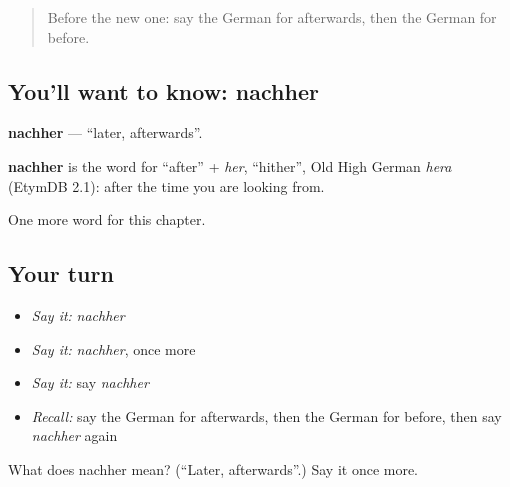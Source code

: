 \begin{quote}
Before the new one: say the German for afterwards, then the German for before.
\end{quote}

\subsection*{You'll want to know: nachher}
\textbf{nachher} — \textquotedblleft{}later, afterwards\textquotedblright{}.

\begin{cousinweb}
\textbf{nachher} is the word for \textquotedblleft{}after\textquotedblright{} + \emph{her}, \textquotedblleft{}hither\textquotedblright{}, Old High German \emph{hera} (EtymDB 2.1): after the time you are looking from.
\end{cousinweb}

\begin{grammarlens}[title={What you've built}]
One more word for this chapter.
\end{grammarlens}

\subsection*{Your turn}
\begin{itemize}
\raggedright
  \item \emph{Say it:} \emph{nachher}
  \item \emph{Say it:} \emph{nachher}, once more
  \item \emph{Say it:} say \emph{nachher}
  \item \emph{Recall:} say the German for afterwards, then the German for before, then say \emph{nachher} again
\end{itemize}

\begin{tcolorbox}[breakable,colback=teal!4,colframe=teal!35!black,title={Before you move on}]
What does nachher mean? (\textquotedblleft{}Later, afterwards\textquotedblright{}.) Say it once more.
\end{tcolorbox}
